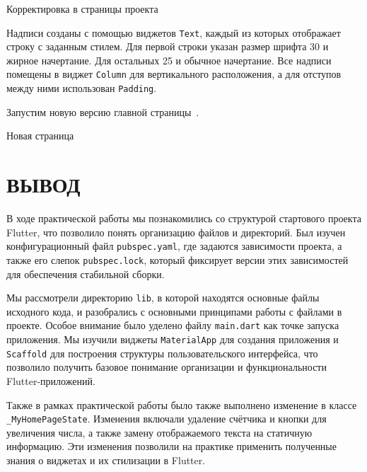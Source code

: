 \begin{image}
	\caption{Корректировка в страницы проекта}
	\label{fig:res:code}
\end{image}


Надписи созданы с помощью виджетов \texttt{Text},
каждый из которых отображает строку с заданным стилем.
Для первой строки указан размер шрифта 30 и жирное начертание.
Для остальных 25 и обычное  начертание.
Все надписи помещены в виджет \texttt{Column} для вертикального расположения,
а для отступов между ними использован \texttt{Padding}.\par
Запустим новую версию главной страницы~.

\begin{image}
	\caption{Новая страница}
	\label{fig:page:new}
\end{image}

\clearpage

\section*{ВЫВОД}

В ходе практической работы мы познакомились
со структурой стартового проекта Flutter,
что позволило понять организацию файлов и директорий.
Был изучен конфигурационный файл \texttt{pubspec.yaml},
где задаются зависимости проекта, а также его слепок \texttt{pubspec.lock},
который фиксирует версии этих зависимостей
для обеспечения стабильной сборки.\par
Мы рассмотрели директорию \texttt{lib},
в которой находятся основные файлы исходного кода,
и разобрались с основными принципами работы с файлами в проекте.
Особое внимание было уделено файлу \texttt{main.dart}
как точке запуска приложения.
Мы изучили виджеты \texttt{MaterialApp} для создания приложения
и \texttt{Scaffold} для построения структуры пользовательского интерфейса,
что позволило получить базовое понимание организации
и функциональности Flutter-приложений.\par
Также в рамках практической работы было также выполнено изменение
в классе \texttt{\_MyHomePageState}.
Изменения включали удаление счётчика и кнопки для увеличения числа,
а также замену отображаемого текста на статичную информацию.
Эти изменения позволили на практике применить полученные знания о виджетах
и их стилизации в Flutter.

